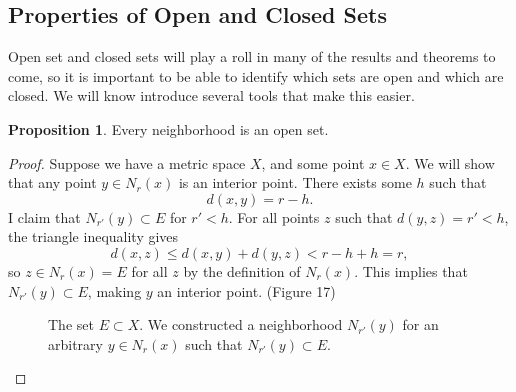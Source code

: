 \documentclass{article}
\theoremstyle{definition}
\newtheorem{proposition}{Proposition}[section]
\begin{document}
\subsection{Properties of Open and Closed Sets}
Open set and closed sets will play a roll in many of the results and theorems to come, so it is important to be able to identify which sets are open and which are closed. We will know introduce several tools that make this easier.  
\begin{proposition}
	Every neighborhood is an open set.
\end{proposition}
\begin{proof}
	Suppose we have a metric space $ X $, and some point $ x\in X $. We will show that any point $ y\in N_r(x) $ is an interior point. There exists some $ h $ such that $$d(x,y)=r-h .$$ I claim that $ N_{r'}(y)\subset E $ for $ r'<h $. For all points $ z $ such that $ d(y,z)=r'<h $, the triangle inequality gives $$d(x,z)\le d(x,y)+d(y,z)<r-h+h=r, $$ so $ z\in N_r(x)=E $ for all $ z $ by the definition of $ N_r(x) $. This implies that $ N_{r'}(y)\subset E $, making $ y $ an interior point. (Figure 17)
	\begin{figure}[h]
		\centering
		\caption{The set $ E\subset X $. We constructed a neighborhood $ N_{r'}(y) $ for an arbitrary $ y\in N_r(x) $ such that $ N_{r'}(y)\subset E $. }
	\end{figure}
\end{proof}
\end{document}
